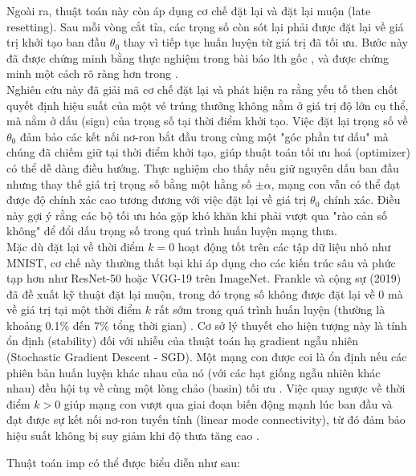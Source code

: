 Ngoài ra, thuật toán này còn áp dụng cơ chế đặt lại và đặt lại muộn (late resetting). Sau mỗi vòng cắt tỉa, các trọng số còn sót lại phải được đặt lại về giá trị khởi tạo ban đầu $\theta_0$ thay vì tiếp tục huấn luyện từ giá trị đã tối ưu. Bước này đã được chứng minh bằng thực nghiệm trong bài báo \gls{lth} gốc \cite[p~.2]{imp}, và được chứng minh một cách rõ ràng hơn trong \cite{deconstructlth}. \\
Nghiên cứu này đã giải mã cơ chế đặt lại và phát hiện ra rằng yếu tố then chốt quyết định hiệu suất của một vé trúng thưởng không nằm ở giá trị độ lớn cụ thể, mà nằm ở dấu (sign) của trọng số tại thời điểm khởi tạo. Việc đặt lại trọng số về $\theta_0$ đảm bảo các kết nối nơ-ron bắt đầu trong cùng một "góc phần tư dấu" mà chúng đã chiếm giữ tại thời điểm khởi tạo, giúp thuật toán tối ưu hoá (optimizer) có thể dễ dàng điều hướng. Thực nghiệm cho thấy nếu giữ nguyên dấu ban đầu nhưng thay thế giá trị trọng số bằng một hằng số $\pm \alpha$, mạng con vẫn có thể đạt được độ chính xác cao tương đương với việc đặt lại về giá trị $\theta_0$ chính xác. Điều này gợi ý rằng các bộ tối ưu hóa gặp khó khăn khi phải vượt qua "rào cản số không" để đổi dấu trọng số trong quá trình huấn luyện mạng thưa. \\
Mặc dù đặt lại về thời điểm $k=0$ hoạt động tốt trên các tập dữ liệu nhỏ như MNIST, cơ chế này thường thất bại khi áp dụng cho các kiến trúc sâu và phức tạp hơn như ResNet-50 hoặc VGG-19 trên ImageNet. Frankle và cộng sự (2019) đã đề xuất kỹ thuật đặt lại muộn, trong đó trọng số không được đặt lại về 0 mà về giá trị tại một thời điểm $k$ rất sớm trong quá trình huấn luyện (thường là khoảng 0.1\% đến 7\% tổng thời gian) \cite{imp}. Cơ sở lý thuyết cho hiện tượng này là tính ổn định (stability) \cite{deconstructlth} đối với nhiễu của thuật toán hạ gradient ngẫu nhiên (Stochastic Gradient Descent - SGD). Một mạng con được coi là ổn định nếu các phiên bản huấn luyện khác nhau của nó (với các hạt giống ngẫu nhiên khác nhau) đều hội tụ về cùng một lòng chảo (basin) tối ưu \cite{imp}. Việc quay ngược về thời điểm $k > 0$ giúp mạng con vượt qua giai đoạn biến động mạnh lúc ban đầu và đạt được sự kết nối nơ-ron tuyến tính (linear mode connectivity), từ đó đảm bảo hiệu suất không bị suy giảm khi độ thưa tăng cao \cite[sec.~4]{lee2024revisiting}.

Thuật toán \gls{imp} có thể được biểu diễn như sau:

